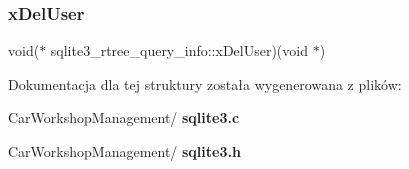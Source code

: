 \mbox{\label{structsqlite3__rtree__query__info_a316a86ba7544e9388646fdd960052cd2}} 
\subsubsection{xDelUser}
{\footnotesize\ttfamily void($\ast$ sqlite3\+\_\+rtree\+\_\+query\+\_\+info\+::x\+Del\+User)(void $\ast$)}



Dokumentacja dla tej struktury została wygenerowana z plików\+:\begin{DoxyCompactItemize}
\item 
Car\+Workshop\+Management/\textbf{ sqlite3.\+c}\item 
Car\+Workshop\+Management/\textbf{ sqlite3.\+h}\end{DoxyCompactItemize}
